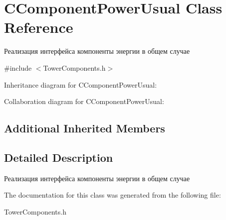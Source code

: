 \hypertarget{classCComponentPowerUsual}{}\section{C\+Component\+Power\+Usual Class Reference}
\label{classCComponentPowerUsual}


Реализация интерфейса компоненты энергии в общем случае  




{\ttfamily \#include $<$Tower\+Components.\+h$>$}



Inheritance diagram for C\+Component\+Power\+Usual\+:


Collaboration diagram for C\+Component\+Power\+Usual\+:
\subsection*{Additional Inherited Members}


\subsection{Detailed Description}
Реализация интерфейса компоненты энергии в общем случае 

The documentation for this class was generated from the following file\+:\begin{DoxyCompactItemize}
\item 
Tower\+Components.\+h\end{DoxyCompactItemize}
